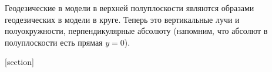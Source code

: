 Геодезические в модели в верхней полуплоскости являются образами геодезических в модели в круге. Теперь это вертикальные лучи и полуокружности, перпендикулярные абсолюту (напомним, что абсолют в полуплоскости есть прямая $y = 0$).

[section]
\renewenvironment{problem}[1][]{\refstepcounter{problem}
	\par\smallskip\noindent
	\ifthenelse{\equal{#1}{}}
	{{\bfseries Задача \theproblem.}}{{\bfseries Задача \theproblem\;{\mdseries(#1)}.}}
}{\par\smallskip}

%
%
%
%
%
%
